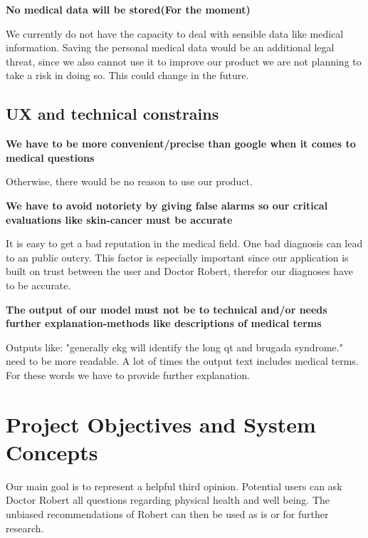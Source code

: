 \documentclass[12pt]{article}
\theoremstyle{definition}
\begin{document}
\pagebreak


{\bf No medical data will be stored(For the moment)}

We currently do not have the capacity to deal with sensible data like medical information. Saving the personal medical data would be an additional legal threat, since we also cannot use it to improve our product we are not planning to take a risk in doing so. This could change in the future.
\vspace{2em}

\subsection{UX and technical constrains}

{\bf We have to be more convenient/precise than google when it comes to medical questions}

Otherwise, there would be no reason to use our product. 
\vspace{2em}

{\bf We have to avoid notoriety by giving false alarms so our critical evaluations like skin-cancer must be accurate}

It is easy to get a bad reputation in the medical field. One bad diagnosis can lead to an public outcry. This factor is especially important since our application is built on trust between the user and Doctor Robert, therefor our diagnoses have to be accurate.
\vspace{2em}

{\bf The output of our model must not be to technical and/or needs further explanation-methods like descriptions of medical terms}

Outputs like: "generally ekg will identify the long qt and brugada syndrome." need to be more readable. A lot of times the output text includes medical terms. For these words we have to provide further explanation.
\vspace{2em}

\pagebreak


\section{Project Objectives and System Concepts}

Our main goal is to represent a helpful third opinion. Potential users can ask Doctor Robert all questions regarding physical health and well being. The unbiased recommendations of Robert can then be used as is or for further research.
\end{document}
